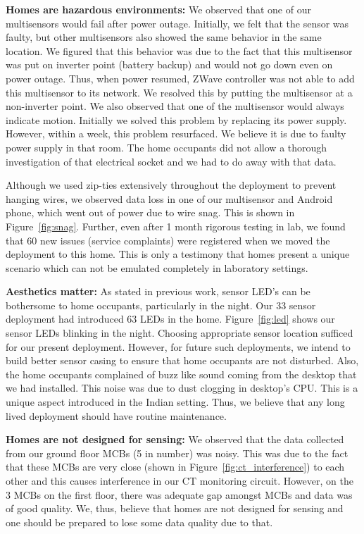 \documentclass[10pt]{sensys-proc}
\newcommand{\figref}[1]{Figure~\ref{#1}}
\begin{document}
\noindent \textbf{Homes are hazardous environments:} We observed that one of our multisensors would fail after power outage. Initially, we felt that the sensor was faulty, but other multisensors also showed the same behavior in the same location. We figured that this behavior was due to the fact that this multisensor was put on inverter point (battery backup) and would not go down even on power outage. Thus, when power resumed, ZWave controller was not able to add this multisensor to its network. We resolved this by putting the multisensor at a non-inverter point. We also observed that one of the multisensor would always indicate motion. Initially we solved this problem by replacing its power supply. However, within a week, this problem resurfaced. We believe it is due to faulty power supply in that room. The home occupants did not allow a thorough investigation of that electrical socket and we had to do away with that data.

\noindent Although we used zip-ties extensively throughout the deployment to prevent hanging wires, we observed data loss in one of our multisensor and Android phone, which went out of power due to wire snag. This is shown in \figref{fig:snag}. Further, even after 1 month rigorous testing in lab, we found that 60 new issues (service complaints) were registered when we moved the deployment to this home. This is only a testimony that homes present a unique scenario which can not be emulated completely in laboratory settings.

\noindent \textbf{Aesthetics matter:} As stated in previous work, sensor LED's can be bothersome to home occupants, particularly in the night. Our 33 sensor deployment had introduced 63 LEDs in the home. \figref{fig:led} shows our sensor LEDs blinking in the night. Choosing appropriate sensor location sufficed for our present deployment. However, for future such deployments, we intend to build better sensor casing to ensure that home occupants are not disturbed. Also, the home occupants complained of buzz like sound coming from the desktop that we had installed. This noise was due to dust clogging in desktop's CPU. This is a unique aspect introduced in the Indian setting. Thus, we believe that any long lived deployment should have routine maintenance.

\noindent \textbf{Homes are not designed for sensing:} We observed that the data collected from our ground floor MCBs (5 in number) was noisy. This was due to the fact that these MCBs are very close (shown in \figref{fig:ct_interference}) to each other and this causes interference in our CT monitoring circuit. However, on the 3 MCBs on the first floor, there was adequate gap amongst MCBs and data was of good quality. We, thus, believe that homes are not designed for sensing and one should be prepared to lose some data quality due to that.
\end{document}
